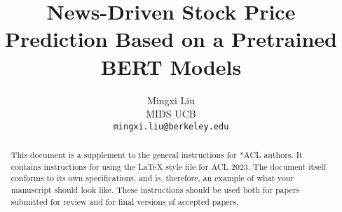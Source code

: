 \documentclass[11pt]{article}
\title{News-Driven Stock Price Prediction Based on a Pretrained BERT Models}
\author{Mingxi Liu \\
  MIDS UCB \\
  \texttt{mingxi.liu@berkeley.edu}}
\begin{document}
\maketitle
\begin{abstract}
This document is a supplement to the general instructions for *ACL authors. It contains instructions for using the \LaTeX{} style file for ACL 2023.
The document itself conforms to its own specifications, and is, therefore, an example of what your manuscript should look like.
These instructions should be used both for papers submitted for review and for final versions of accepted papers.
\end{abstract}



\end{document}
